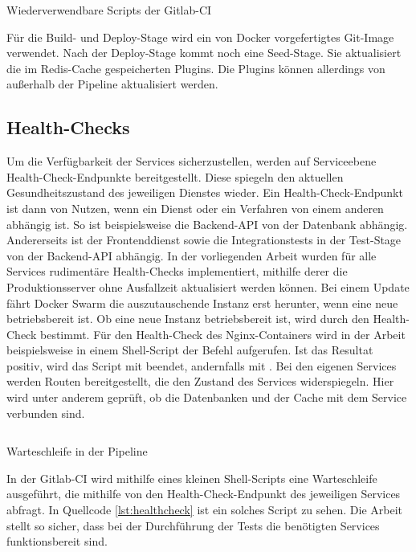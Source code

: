 \begin{listing}
    \inputminted{yaml}{snippets/yml/reusable_scripts.yml}
    \caption{Wiederverwendbare Scripts der Gitlab-CI}
    \label{lst:wiederverwendbarescriptsdergitlabci}
\end{listing}

Für die Build- und Deploy-Stage wird ein von Docker vorgefertigtes Git-Image verwendet. Nach der Deploy-Stage
kommt noch eine Seed-Stage. Sie aktualisiert die im Redis-Cache gespeicherten Plugins. Die Plugins können
allerdings von außerhalb der Pipeline aktualisiert werden.

\subsection{Health-Checks}
\label{subsec:healthcheck}
Um die Verfügbarkeit der Services sicherzustellen, werden auf
Serviceebene Health-Check-Endpunkte bereitgestellt. Diese spiegeln den aktuellen
Gesundheitszustand des jeweiligen Dienstes wieder. Ein Health-Check-Endpunkt
ist dann von Nutzen, wenn ein Dienst oder ein Verfahren von einem anderen
abhängig ist. So ist beispielsweise die Backend-API von der Datenbank
abhängig. Andererseits ist der Frontenddienst sowie die Integrationstests
in der Test-Stage von der Backend-API abhängig. In der vorliegenden Arbeit wurden für alle Services
rudimentäre Health-Checks implementiert, mithilfe derer die Produktionsserver ohne Ausfallzeit
aktualisiert werden können. Bei einem Update fährt Docker Swarm die auszutauschende
Instanz erst herunter, wenn eine neue betriebsbereit ist. Ob eine neue Instanz betriebsbereit ist,
wird durch den Health-Check bestimmt. Für den Health-Check des Nginx-Containers wird in der Arbeit beispielsweise
in einem Shell-Script der Befehl  aufgerufen. Ist das Resultat positiv, wird
das Script mit  beendet, andernfalls mit . Bei den eigenen Services werden 
Routen bereitgestellt, die den Zustand des Services widerspiegeln. Hier wird unter anderem geprüft, ob die Datenbanken
und der Cache mit dem Service verbunden sind.

\begin{listing}
    \inputminted{sh}{snippets/sh/healthcheck.sh}
    \caption{Warteschleife in der Pipeline}
    \label{lst:healthcheck}
\end{listing}

In der Gitlab-CI wird mithilfe eines kleinen Shell-Scripts eine Warteschleife ausgeführt, die mithilfe von
 den Health-Check-Endpunkt des jeweiligen Services abfragt. In Quellcode \ref{lst:healthcheck}
ist ein solches Script zu sehen. Die Arbeit stellt so sicher, dass bei der Durchführung der Tests die
benötigten Services funktionsbereit sind.

